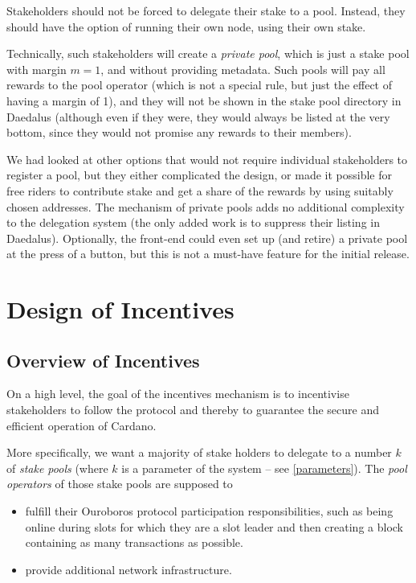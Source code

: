 \documentclass[11pt,a4paper,dvipsnames,twosided]{article}
\begin{document}
Stakeholders should not be forced to delegate their stake to a
pool. Instead, they should have the option of running their own node,
using their own stake.

Technically, such stakeholders will create a \emph{private pool}, which is just
a stake pool with margin \(m=1\), and without providing metadata. Such pools
will pay all rewards to the pool operator (which is not a special rule, but just
the effect of having a margin of 1), and they will not be shown in the stake
pool directory in Daedalus (although even if they were, they would always be
listed at the very bottom, since they would not promise any rewards to their
members).

We had looked at other options that would not require individual
stakeholders to register a pool, but they either complicated the
design, or made it possible for free riders to contribute stake and
get a share of the rewards by using suitably chosen addresses. The
mechanism of private pools adds no additional complexity to the
delegation system (the only added work is to suppress their listing in
Daedalus). Optionally, the front-end could even set up (and retire) a
private pool at the press of a button, but this is not a must-have
feature for the initial release.

\section{Design of Incentives}
\label{design-of-incentives}

\subsection{Overview of Incentives}
\label{overview-of-incentives}

On a high level, the goal of the incentives mechanism is to incentivise
stakeholders to follow the protocol and thereby to guarantee the secure and
efficient operation of Cardano.

More specifically, we want a majority of stake holders to
delegate to a number \(k\) of \emph{stake pools} (where \(k\) is a
parameter of the system -- see \cref{parameters}). The
\emph{pool operators} of those stake pools are supposed to

\begin{itemize}
\item
  fulfill their Ouroboros protocol participation responsibilities,
  such as being online during slots for which they are a slot leader and
  then creating a block containing as many transactions as possible.
\item
  provide additional network infrastructure.
\end{itemize}
\end{document}
